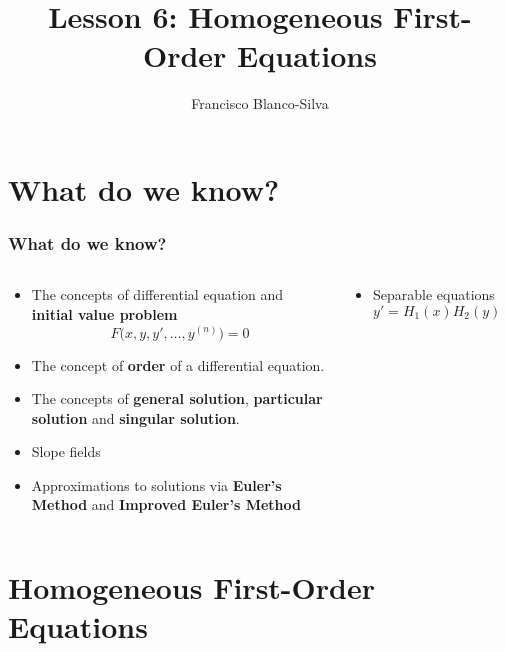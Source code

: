 \documentclass[smaller,xcolor=x11names,compress]{beamer}
\author[Francisco Blanco-Silva]{Francisco Blanco-Silva}
\institute[USC]{University of South Carolina}
\date{
\begin{tikzpicture} 
\draw [blue!75!black, rotate=90]
[l-system={rule set={F -> FF-[-F+F]+[+F-F]}, axiom=F, order=4, step=2pt, 
randomize step percent=25, angle=30, randomize angle percent=5}]
lindenmayer system; 
\end{tikzpicture}
\\
\today
}
\title{Lesson 6: Homogeneous First-Order Equations}
\begin{document}
\frame{\titlepage}

\section{What do we know?}
\begin{frame}\frametitle{What do we know?}
\begin{columns}[T]
\begin{column}{0.6\linewidth}
\begin{itemize}[<+-|alert@+>]
\item The concepts of differential equation and \textbf{initial value problem}
\begin{equation*}
F\big(x,y,y',\dotsc,y^{(n)}\big)=0
\end{equation*}
\item The concept of \textbf{order} of a differential equation.
\item The concepts of \textbf{general solution}, \textbf{particular solution} and \textbf{singular solution}.
\item Slope fields
\item Approximations to solutions via \textbf{Euler's Method} and \textbf{Improved Euler's Method}
\end{itemize} 
\end{column}
\begin{column}{0.4\linewidth}
\begin{itemize}[<+-|alert@+>]
\item Separable equations $y'=H_1(x) H_2(y)$
\end{itemize}
\end{column}
\end{columns}
\end{frame}

\section{Homogeneous First-Order Equations}
\end{document}
